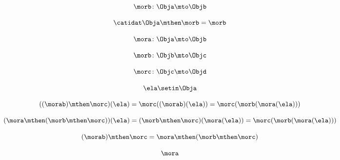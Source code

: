 {\begin{forslides}
        \begin{equation}
            \label{eq:semicats-slides-93}
            \morb \colon \Obja \mto \Objb
        \end{equation}

        \begin{equation}
            \label{eq:semicats-slides-94}
            \catidat\Obja \mthen \morb = \morb
        \end{equation}

        \begin{equation}
            \label{eq:semicats-slides-95}
            \mora \colon \Obja \mto \Objb
        \end{equation}

        \begin{equation}
            \label{eq:semicats-slides-96}
            \morb\colon \Objb \mto \Objc
        \end{equation}

        \begin{equation}
            \label{eq:semicats-slides-97}
            \morc \colon \Objc \mto \Objd
        \end{equation}

        \begin{equation}
            \label{eq:semicats-slides-98}
            \ela \setin \Obja
        \end{equation}

        \begin{equation}
            \label{eq:semicats-slides-99}
            ((\morab) \mthen \morc)(\ela) =  \morc((\morab)(\ela)) = \morc (\morb (\mora (\ela)))
        \end{equation}

        \begin{equation}
            \label{eq:semicats-slides-99b}
            (\mora \mthen (\morb \mthen \morc))(\ela)
            =  (\morb \mthen \morc)(\mora(\ela)) = \morc (\morb (\mora (\ela)))
        \end{equation}

        \begin{equation}
            \label{eq:semicats-slides-100}
            (\morab)
            \mthen \morc = \mora \mthen (\morb \mthen \morc)
        \end{equation}

        \begin{equation}
            \label{eq:semicats-slides-101}
            \mora
        \end{equation}


\end{forslides}}
